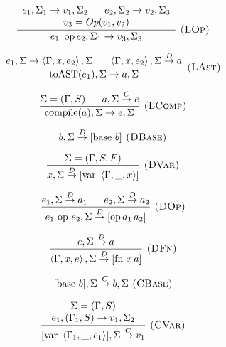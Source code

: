 \begin{figure}
\begin{minipage}[t]{0.59\columnwidth}
{\footnotesize{}
\[
\frac{\begin{array}[t]{c}
e_{1},\Sigma_{1}\rightarrow v_{1},\Sigma_{2}\,\,\,\,\,\,\,\,\,\, e_{2},\Sigma_{2}\rightarrow v_{2},\Sigma_{3}\\
v_{3}=Op(v_{1},v_{2})
\end{array}}{e_{1}\mbox{\,\ op\,}e_{2},\Sigma_{1}\rightarrow v_{3},\Sigma_{3}}\textsc{ (LOp)}
\]
}{\footnotesize \par}

{\footnotesize{}
\[
\frac{e_{1},\Sigma\rightarrow\left\langle \Gamma,x,e_{2}\right\rangle ,\Sigma\,\,\,\,\,\,\,\,\,\,\left\langle \Gamma,x,e_{2}\right\rangle ,\Sigma\overset{D}{\rightarrow}a}{\mbox{toAST(\ensuremath{e_{1}})},\Sigma\rightarrow a,\Sigma}\textsc{ (LAst)}
\]
}{\footnotesize \par}

{\footnotesize{}
\[
\frac{\Sigma=(\Gamma,S)\,\,\,\,\,\,\,\,\,\, a,\Sigma\overset{C}{\rightarrow}e}{\mbox{compile(\ensuremath{a})},\Sigma\rightarrow e,\Sigma}\textsc{ (LComp)}
\]
}%
\end{minipage}{\footnotesize{}}%
\begin{minipage}[t]{0.4\columnwidth}%
{\footnotesize{}
\[
b,\Sigma\overset{D}{\rightarrow}[\mbox{base }b]\textsc{ (DBase)}
\]
}{\footnotesize \par}

{\footnotesize{}
\[
\frac{\Sigma=(\Gamma,S,F)}{x,\Sigma\overset{D}{\rightarrow}[\mbox{var }\left\langle \Gamma,\_,x\right\rangle ]}\textsc{ (DVar)}
\]
}{\footnotesize \par}

{\footnotesize{}
\[
\frac{e_{1},\Sigma\overset{D}{\rightarrow}a_{1}\,\,\,\,\,\,\,\,\,\, e_{2},\Sigma\overset{D}{\rightarrow}a_{2}}{e_{1}\mbox{ op }e_{2},\Sigma\overset{D}{\rightarrow}[\mbox{op\,\ensuremath{a_{1}\,}\ensuremath{a_{2}}}]}\textsc{ (DOp)}
\]
}{\footnotesize \par}

{\footnotesize{}
\[
\frac{e,\Sigma\overset{D}{\rightarrow}a}{\left\langle \Gamma,x,e\right\rangle ,\Sigma\overset{D}{\rightarrow}[\mbox{fn }x\, a]}\textsc{ (DFn)}
\]
}{\footnotesize \par}

{\footnotesize{}
\[
[\mbox{base \ensuremath{b}}],\Sigma\overset{C}{\rightarrow}b,\Sigma\textsc{ (CBase)}
\]
}{\footnotesize \par}

{\footnotesize{}
\[
\frac{\begin{array}[t]{c}
\Sigma=(\Gamma,S)\\
e_{1},(\Gamma_{1},S)\rightarrow v_{1},\Sigma_{2}
\end{array}}{[\mbox{var }\left\langle \Gamma_{1},\_,e_{1}\right\rangle ],\Sigma\overset{C}{\rightarrow}v_{1}}\textsc{ (CVar)}
\]
}{\footnotesize \par}


\end{minipage}
\end{figure}
